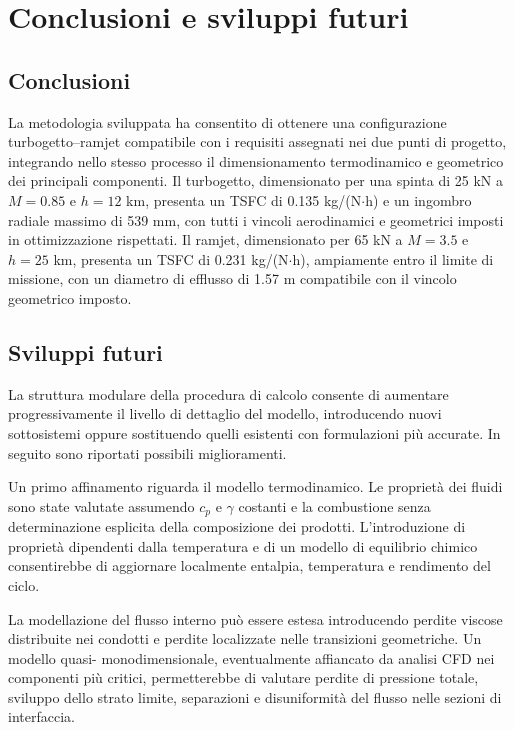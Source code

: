 \label{ch:chapter_finale}%
\chapter{Conclusioni e sviluppi futuri}

\section{Conclusioni}

La metodologia sviluppata ha consentito di ottenere una configurazione turbogetto--ramjet
compatibile con i requisiti assegnati nei due punti di progetto, integrando nello stesso
processo il dimensionamento termodinamico e geometrico dei principali componenti. Il
turbogetto, dimensionato per una spinta di 25 kN a $M=0.85$ e $h=12$ km, presenta un
TSFC di 0.135 kg/(N$\cdot$h) e un ingombro radiale massimo di 539 mm, con tutti i vincoli
aerodinamici e geometrici imposti in ottimizzazione rispettati. Il ramjet, dimensionato per 65 kN a $M=3.5$ e $h=25$ km,
presenta un TSFC di 0.231 kg/(N$\cdot$h), ampiamente entro il limite di missione, con un
diametro di efflusso di 1.57 m compatibile con il vincolo geometrico imposto.

\section{Sviluppi futuri}

La struttura modulare della procedura di calcolo consente di aumentare
progressivamente il livello di dettaglio del modello, introducendo nuovi
sottosistemi oppure sostituendo quelli esistenti con formulazioni più
accurate. In seguito sono riportati possibili miglioramenti.

Un primo affinamento riguarda il modello termodinamico. Le proprietà dei fluidi sono state
valutate assumendo $c_p$ e $\gamma$ costanti e la combustione senza determinazione esplicita della
composizione dei prodotti. L'introduzione di proprietà dipendenti dalla temperatura e di un
modello di equilibrio chimico consentirebbe di aggiornare localmente entalpia, temperatura e
rendimento del ciclo.

La modellazione del flusso interno può essere estesa introducendo perdite viscose distribuite
nei condotti e perdite localizzate nelle transizioni geometriche. Un modello quasi-
monodimensionale, eventualmente affiancato da analisi CFD nei componenti più critici,
permetterebbe di valutare perdite di pressione totale, sviluppo dello strato limite, separazioni e
disuniformità del flusso nelle sezioni di interfaccia.

